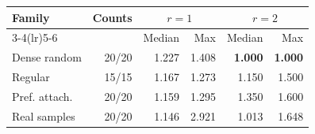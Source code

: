 \begin{tabular*}{\columnwidth}{@{\extracolsep{\fill}}lrrrrr@{}}
\toprule
Family & Counts & \multicolumn{2}{c}{$r=1$} & \multicolumn{2}{c}{$r=2$} \\
\cmidrule(lr){3-4}\cmidrule(lr){5-6}
& & Median & Max & Median & Max \\
\midrule
Dense random & 20/20 & 1.227 & 1.408 & \textbf{1.000} & \textbf{1.000} \\
Regular & 15/15 & 1.167 & 1.273 & 1.150 & 1.500 \\
Pref. attach. & 20/20 & 1.159 & 1.295 & 1.350 & 1.600 \\
Real samples & 20/20 & 1.146 & 2.921 & 1.013 & 1.648 \\
\bottomrule
\end{tabular*}
